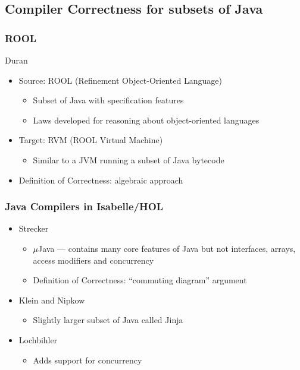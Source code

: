 \documentclass{beamer}
\newcommand{\footmake}[1]{
\ifthenelse{\equal{#1}{}}%
	{}%
	{\footnotetext{#1}}%
}
\newenvironment{slide}[2][fragile,environment=slide]
{\begin{frame}[#1]
	\frametitle{#2}\begin{refsegment}}
{\footmake{\printbibliography[segment=\therefsegment]}\end{refsegment}\end{frame}}
\begin{document}
\subsection{Compiler Correctness for subsets of Java}

\begin{slide}{ROOL}
  Duran\cite{duran2005, duran2010}
  \begin{itemize}
  \item Source: ROOL (Refinement Object-Oriented Language)\cite{cavalcanti2000}
    \begin{itemize}
    \item Subset of Java with specification features
    \item Laws developed for reasoning about object-oriented languages\cite{borba2000}
    \end{itemize}
  \item Target: RVM (ROOL Virtual Machine)
    \begin{itemize}
    \item Similar to a JVM running a subset of Java bytecode
    \end{itemize}
  \item Definition of Correctness: algebraic approach
  \end{itemize}
\end{slide}

\begin{slide}{Java Compilers in Isabelle/HOL}
  \begin{itemize}
  \item Strecker\cite{strecker2002}
    \begin{itemize}
    \item $\mu$Java --- contains many core features of Java but not interfaces, arrays, access modifiers and concurrency
    \item Definition of Correctness: ``commuting diagram'' argument
    \end{itemize}
  \item Klein and Nipkow\cite{klein2006}
    \begin{itemize}
    \item Slightly larger subset of Java called Jinja
    \end{itemize}
  \item Lochbihler\cite{lochbihler2010}
    \begin{itemize}
    \item Adds support for concurrency
    \end{itemize}
  \end{itemize}
\end{slide}
\end{document}
